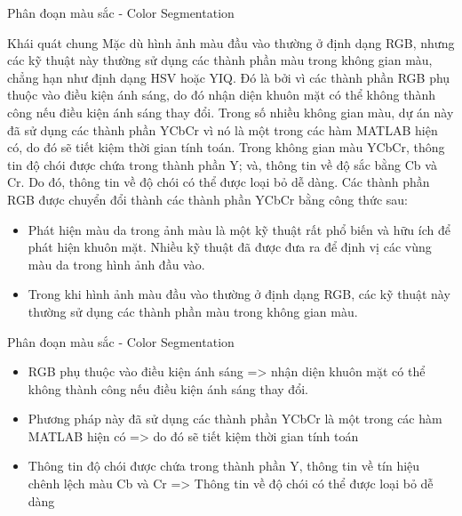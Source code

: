 \documentclass[10.5pt]{beamer}
\begin{document}
\begin{frame}{\fontsize{11.5pt}{12.5pt}\selectfont Phân đoạn màu sắc - Color Segmentation}
	\begin{block}{\fontsize{9pt}{10.5pt}\selectfont Khái quát chung}
		\fontsize{7.5pt}{10.5pt}\selectfont Mặc dù hình ảnh màu đầu vào thường ở định dạng RGB, nhưng các kỹ thuật này thường sử dụng các thành phần màu trong không gian màu, chẳng hạn như định dạng HSV hoặc YIQ. Đó là bởi vì các thành phần RGB phụ thuộc vào điều kiện ánh sáng, do đó nhận diện khuôn mặt có thể không thành công nếu điều kiện ánh sáng thay đổi. Trong số nhiều không gian màu, dự án này đã sử dụng các thành phần YCbCr vì nó là một trong các hàm MATLAB hiện có, do đó sẽ tiết kiệm thời gian tính toán. Trong không gian màu YCbCr, thông tin độ chói được chứa trong thành phần Y; và, thông tin về độ sắc bằng Cb và Cr. Do đó, thông tin về độ chói có thể được loại bỏ dễ dàng. Các thành phần RGB được chuyển đổi thành các thành phần YCbCr bằng công thức sau:
	\end{block}
	\begin{block}{}
		\begin{itemize}
			\item \fontsize{7.5pt}{10.5pt}\selectfont Phát hiện màu da trong ảnh màu là một kỹ thuật rất phổ biến và hữu ích để phát hiện khuôn mặt. Nhiều kỹ thuật đã được đưa ra để định vị các vùng màu da trong hình ảnh đầu vào. 
			\item \fontsize{7.5pt}{10.5pt}\selectfont Trong khi hình ảnh màu đầu vào thường ở định dạng RGB, các kỹ thuật này thường sử dụng các thành phần màu trong không gian màu.
		\end{itemize}
	\end{block}
\end{frame}
\begin{frame}{\fontsize{11.5pt}{12.5pt}\selectfont Phân đoạn màu sắc - Color Segmentation}
	\begin{itemize}
		\item \fontsize{7.5pt}{10.5pt}\selectfont RGB phụ thuộc vào điều kiện ánh sáng => nhận diện khuôn mặt có thể không thành công nếu điều kiện ánh sáng thay đổi.
		\item \fontsize{7.5pt}{10.5pt}\selectfont Phương pháp này đã sử dụng các thành phần YCbCr là một trong các hàm MATLAB hiện có => do đó sẽ tiết kiệm thời gian tính toán
		\item \fontsize{7.5pt}{10.5pt}\selectfont Thông tin độ chói được chứa trong thành phần Y, thông tin về tín hiệu chênh lệch màu Cb và Cr => Thông tin về độ chói có thể được loại bỏ dễ dàng
	\end{itemize}
\end{frame}
\end{document}
